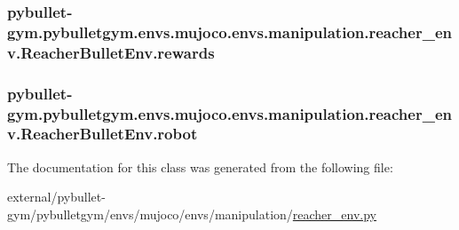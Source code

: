 \subsubsection[{\texorpdfstring{rewards}{rewards}}]{\setlength{\rightskip}{0pt plus 5cm}pybullet-\/gym.\+pybulletgym.\+envs.\+mujoco.\+envs.\+manipulation.\+reacher\+\_\+env.\+Reacher\+Bullet\+Env.\+rewards}\hypertarget{classpybullet-gym_1_1pybulletgym_1_1envs_1_1mujoco_1_1envs_1_1manipulation_1_1reacher__env_1_1_reacher_bullet_env_ae0a17f743d9406dab74c3b8b9e066b68}{}\label{classpybullet-gym_1_1pybulletgym_1_1envs_1_1mujoco_1_1envs_1_1manipulation_1_1reacher__env_1_1_reacher_bullet_env_ae0a17f743d9406dab74c3b8b9e066b68}
\subsubsection[{\texorpdfstring{robot}{robot}}]{\setlength{\rightskip}{0pt plus 5cm}pybullet-\/gym.\+pybulletgym.\+envs.\+mujoco.\+envs.\+manipulation.\+reacher\+\_\+env.\+Reacher\+Bullet\+Env.\+robot}\hypertarget{classpybullet-gym_1_1pybulletgym_1_1envs_1_1mujoco_1_1envs_1_1manipulation_1_1reacher__env_1_1_reacher_bullet_env_a3f5ad523cd7f02e960aea11dcff72bbf}{}\label{classpybullet-gym_1_1pybulletgym_1_1envs_1_1mujoco_1_1envs_1_1manipulation_1_1reacher__env_1_1_reacher_bullet_env_a3f5ad523cd7f02e960aea11dcff72bbf}


The documentation for this class was generated from the following file\+:\begin{DoxyCompactItemize}
\item 
external/pybullet-\/gym/pybulletgym/envs/mujoco/envs/manipulation/\hyperlink{mujoco_2envs_2manipulation_2reacher__env_8py}{reacher\+\_\+env.\+py}\end{DoxyCompactItemize}
